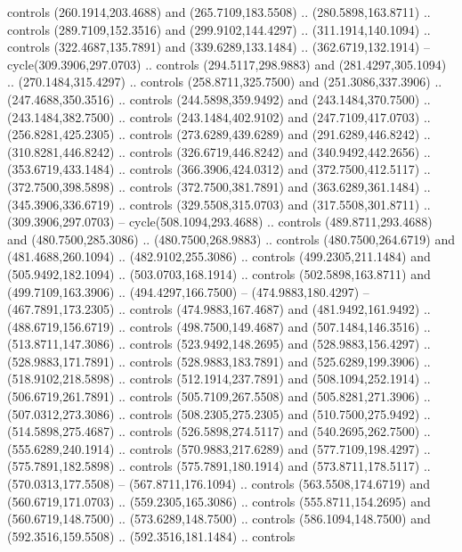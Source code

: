 {{\begin{scope}[x=0.80pt,y=-0.80pt,scale=0.038,xshift=-380pt,yshift=360pt]
        controls (260.1914,203.4688) and (265.7109,183.5508) .. (280.5898,163.8711) ..
        controls (289.7109,152.3516) and (299.9102,144.4297) .. (311.1914,140.1094) ..
        controls (322.4687,135.7891) and (339.6289,133.1484) .. (362.6719,132.1914) --
        cycle(309.3906,297.0703) .. controls (294.5117,298.9883) and
        (281.4297,305.1094) .. (270.1484,315.4297) .. controls (258.8711,325.7500) and
        (251.3086,337.3906) .. (247.4688,350.3516) .. controls (244.5898,359.9492) and
        (243.1484,370.7500) .. (243.1484,382.7500) .. controls (243.1484,402.9102) and
        (247.7109,417.0703) .. (256.8281,425.2305) .. controls (273.6289,439.6289) and
        (291.6289,446.8242) .. (310.8281,446.8242) .. controls (326.6719,446.8242) and
        (340.9492,442.2656) .. (353.6719,433.1484) .. controls (366.3906,424.0312) and
        (372.7500,412.5117) .. (372.7500,398.5898) .. controls (372.7500,381.7891) and
        (363.6289,361.1484) .. (345.3906,336.6719) .. controls (329.5508,315.0703) and
        (317.5508,301.8711) .. (309.3906,297.0703) -- cycle(508.1094,293.4688) ..
        controls (489.8711,293.4688) and (480.7500,285.3086) .. (480.7500,268.9883) ..
        controls (480.7500,264.6719) and (481.4688,260.1094) .. (482.9102,255.3086) ..
        controls (499.2305,211.1484) and (505.9492,182.1094) .. (503.0703,168.1914) ..
        controls (502.5898,163.8711) and (499.7109,163.3906) .. (494.4297,166.7500) --
        (474.9883,180.4297) -- (467.7891,173.2305) .. controls (474.9883,167.4687) and
        (481.9492,161.9492) .. (488.6719,156.6719) .. controls (498.7500,149.4687) and
        (507.1484,146.3516) .. (513.8711,147.3086) .. controls (523.9492,148.2695) and
        (528.9883,156.4297) .. (528.9883,171.7891) .. controls (528.9883,183.7891) and
        (525.6289,199.3906) .. (518.9102,218.5898) .. controls (512.1914,237.7891) and
        (508.1094,252.1914) .. (506.6719,261.7891) .. controls (505.7109,267.5508) and
        (505.8281,271.3906) .. (507.0312,273.3086) .. controls (508.2305,275.2305) and
        (510.7500,275.9492) .. (514.5898,275.4687) .. controls (526.5898,274.5117) and
        (540.2695,262.7500) .. (555.6289,240.1914) .. controls (570.9883,217.6289) and
        (577.7109,198.4297) .. (575.7891,182.5898) .. controls (575.7891,180.1914) and
        (573.8711,178.5117) .. (570.0313,177.5508) -- (567.8711,176.1094) .. controls
        (563.5508,174.6719) and (560.6719,171.0703) .. (559.2305,165.3086) .. controls
        (555.8711,154.2695) and (560.6719,148.7500) .. (573.6289,148.7500) .. controls
        (586.1094,148.7500) and (592.3516,159.5508) .. (592.3516,181.1484) .. controls

\end{scope}}}
